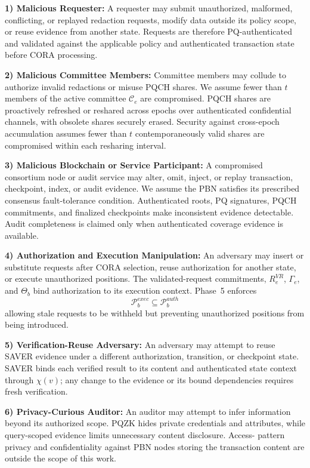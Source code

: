 \documentclass[lettersize,journal]{IEEEtran}
\begin{document}
\textbf{1) Malicious Requester:}
A requester may submit unauthorized, malformed, conflicting, or replayed
redaction requests, modify data outside its policy scope, or reuse
evidence from another state. Requests are therefore PQ-authenticated
and validated against the applicable policy and authenticated
transaction state before CORA processing.

\textbf{2) Malicious Committee Members:}
Committee members may collude to authorize invalid redactions or misuse
PQCH shares. We assume fewer than $t$ members of the active committee
$\mathcal{C}_e$ are compromised. PQCH shares are proactively refreshed
or reshared across epochs over authenticated confidential channels,
with obsolete shares securely erased. Security against cross-epoch
accumulation assumes fewer than $t$ contemporaneously valid shares are
compromised within each resharing interval.

\textbf{3) Malicious Blockchain or Service Participant:}
A compromised consortium node or audit service may alter, omit, inject,
or replay transaction, checkpoint, index, or audit evidence. We assume
the PBN satisfies its prescribed consensus fault-tolerance condition.
Authenticated roots, PQ signatures, PQCH commitments, and finalized
checkpoints make inconsistent evidence detectable. Audit completeness
is claimed only when authenticated coverage evidence is available.

\textbf{4) Authorization and Execution Manipulation:}
An adversary may insert or substitute requests after CORA selection,
reuse authorization for another state, or execute unauthorized
positions. The validated-request commitments, $R_e^{VR}$, $\Gamma_e$,
and $\Theta_b$ bind authorization to its execution context. Phase~5
enforces
\begin{equation}
\mathcal{P}_b^{exec}\subseteq\mathcal{P}_b^{auth}
\label{eq:subset}
\end{equation}
allowing stale requests to be withheld but preventing unauthorized
positions from being introduced.

\textbf{5) Verification-Reuse Adversary:}
An adversary may attempt to reuse SAVER evidence under a different
authorization, transition, or checkpoint state. SAVER binds each
verified result to its content and authenticated state context through
$\chi(v)$; any change to the evidence or its bound dependencies
requires fresh verification.

\textbf{6) Privacy-Curious Auditor:}
An auditor may attempt to infer information beyond its authorized
scope. PQZK hides private credentials and attributes, while
query-scoped evidence limits unnecessary content disclosure. Access-
pattern privacy and confidentiality against PBN nodes storing the
transaction content are outside the scope of this work.
\end{document}
